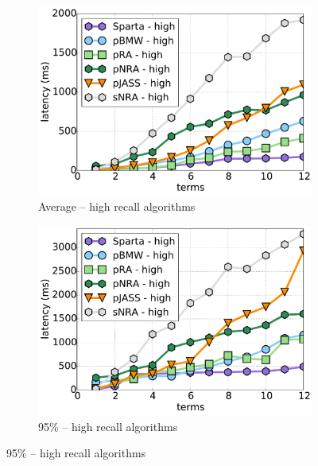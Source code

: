 {{\begin{figure}[tbh]
      \begin{subfigure}{0.4\textwidth}
         \includegraphics[width=\textwidth]{figures/latency_12threads_clueweb.pdf}
        \caption{Average\bigdataset{, \cw} -- high recall algorithms}
        \label{fig:terms-scaling-high-avg}
      \end{subfigure}%
	\begin{subfigure}{0.4\textwidth}
    	\includegraphics[width=\textwidth]{figures/latency_95th_percentile_clueweb.pdf}
	\caption{95\%\bigdataset{, \cw} -- high recall algorithms}
	\label{fig:terms-scaling-high-95}
    \end{subfigure} 


\end{figure}}}
